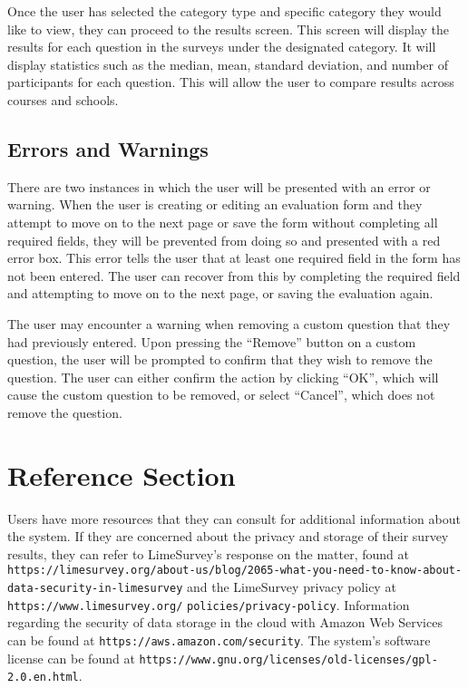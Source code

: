 \documentclass{article}
\begin{document}
Once the user has selected the category type and specific category they would like to view, they can proceed to the results screen. This screen will display the results for each question in the surveys under the designated category. It will display statistics such as the median, mean, standard deviation, and number of participants for each question. This will allow the user to compare results across courses and schools.

\subsection{Errors and Warnings}

There are two instances in which the user will be presented with an error or warning. When the user is creating or editing an evaluation form and they attempt to move on to the next page or save the form without completing all required fields, they will be prevented from doing so and presented with a red error box. This error tells the user that at least one required field in the form has not been entered. The user can recover from this by completing the required field and attempting to move on to the next page, or saving the evaluation again.

The user may encounter a warning when removing a custom question that they had previously entered. Upon pressing the ``Remove'' button on a custom question, the user will be prompted to confirm that they wish to remove the question. The user can either confirm the action by clicking ``OK'', which will cause the custom question to be removed, or select ``Cancel'', which does not remove the question.

\section{Reference Section}

Users have more resources that they can consult for additional information about the system. If they are concerned about the privacy and storage of their survey results, they can refer to LimeSurvey's response on the matter, found at \verb|https://limesurvey.org/about-us/blog/2065-what-you-need-to-know-about-| \verb|data-security-in-limesurvey| and the LimeSurvey privacy policy at \verb|https://www.limesurvey.org/| \verb|policies/privacy-policy|. Information regarding the security of data storage in the cloud with Amazon Web Services can be found at \verb|https://aws.amazon.com/security|. The system's software license can be found at \verb|https://www.gnu.org/licenses/old-licenses/gpl-2.0.en.html|.
\end{document}
